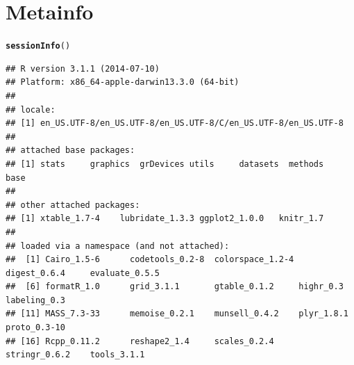 \documentclass{article}\usepackage[]{graphicx}\usepackage[]{color}
\makeatletter
\newcommand{\hlstd}[1]{\textcolor[rgb]{0.345,0.345,0.345}{#1}}%
\newcommand{\hlkwd}[1]{\textcolor[rgb]{0.737,0.353,0.396}{\textbf{#1}}}%
\newenvironment{kframe}{%
 \def\at@end@of@kframe{}%
 \ifinner\ifhmode%
  \def\at@end@of@kframe{\end{minipage}}%
  \begin{minipage}{\columnwidth}%
 \fi\fi%
 \def\FrameCommand##1{\hskip\@totalleftmargin \hskip-\fboxsep
 \colorbox{shadecolor}{##1}\hskip-\fboxsep
     \hskip-\linewidth \hskip-\@totalleftmargin \hskip\columnwidth}%
 \MakeFramed {\advance\hsize-\width
   \@totalleftmargin\z@ \linewidth\hsize
   \@setminipage}}%
 {\par\unskip\endMakeFramed%
 \at@end@of@kframe}
\newenvironment{knitrout}{}{} %
\makeatother
\begin{document}
\section{Metainfo}
\begin{knitrout}
\color{fgcolor}\begin{kframe}
\begin{alltt}
\hlkwd{sessionInfo}\hlstd{()}
\end{alltt}
\begin{verbatim}
## R version 3.1.1 (2014-07-10)
## Platform: x86_64-apple-darwin13.3.0 (64-bit)
## 
## locale:
## [1] en_US.UTF-8/en_US.UTF-8/en_US.UTF-8/C/en_US.UTF-8/en_US.UTF-8
## 
## attached base packages:
## [1] stats     graphics  grDevices utils     datasets  methods   base     
## 
## other attached packages:
## [1] xtable_1.7-4    lubridate_1.3.3 ggplot2_1.0.0   knitr_1.7      
## 
## loaded via a namespace (and not attached):
##  [1] Cairo_1.5-6      codetools_0.2-8  colorspace_1.2-4 digest_0.6.4     evaluate_0.5.5  
##  [6] formatR_1.0      grid_3.1.1       gtable_0.1.2     highr_0.3        labeling_0.3    
## [11] MASS_7.3-33      memoise_0.2.1    munsell_0.4.2    plyr_1.8.1       proto_0.3-10    
## [16] Rcpp_0.11.2      reshape2_1.4     scales_0.2.4     stringr_0.6.2    tools_3.1.1
\end{verbatim}
\end{kframe}
\end{knitrout}
\end{document}
